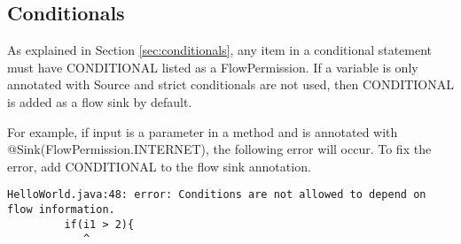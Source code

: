 \subsection{Conditionals}
As explained in Section \ref{sec:conditionals}, any item in a conditional statement must have CONDITIONAL listed as a FlowPermission.  If a variable is only annotated with Source and strict conditionals are not used, then CONDITIONAL is added as a flow sink by default. 

For example, if input is a parameter in a method and is annotated with @Sink(FlowPermission.INTERNET), the following error will occur.  To fix the error, add CONDITIONAL to the flow sink annotation.  

\begin{Verbatim}
HelloWorld.java:48: error: Conditions are not allowed to depend on flow information.
         if(i1 > 2){
            ^
\end{Verbatim}




